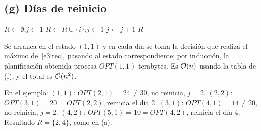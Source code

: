 \subsection*{(g) Días de reinicio}

\begin{algorithm}[H]
\caption{Conjunto óptimo de días de reinicio}
\begin{algorithmic}[1]
  \State $R\gets\emptyset$;\quad $j\gets 1$
      \State $R\gets R\cup\{i\}$;\quad $j\gets 1$ 
    \Else
      \State $j\gets j+1$ 
    \EndIf
  \EndFor
  \State \Return $R$ 
\EndFunction
\end{algorithmic}
\end{algorithm}

Se arranca en el estado $(1,1)$ y en cada día se toma la decisión que realiza el máximo de~\eqref{e3:rec}, pasando al estado correspondiente; por inducción, la planificación obtenida procesa $OPT(1,1)$ terabytes. Es $\mathcal{O}(n)$ usando la tabla de (f), y el total es $\mathcal{O}(n^2)$.

En el ejemplo: $(1,1)$: $OPT(2,1)=24\ne 30$, no reinicia, $j=2$. $(2,2)$: $OPT(3,1)=20=OPT(2,2)$, reinicia el día 2. $(3,1)$: $OPT(4,1)=14\ne 20$, no reinicia, $j=2$. $(4,2)$: $OPT(5,1)=10=OPT(4,2)$, reinicia el día 4. Resultado $R=\{2,4\}$, como en (a).


